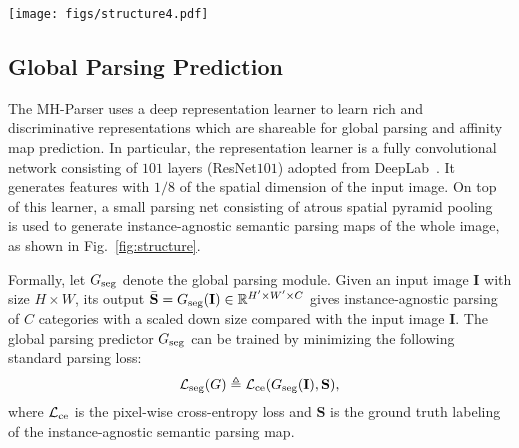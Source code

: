 \documentclass[10pt, letterpaper]{article}
\begin{document}
\begin{figure*}[t]
  \centering
  \texttt{[image: figs/structure4.pdf]}
  \caption{Architecture overview of the proposed Multiple Human Parser (MH-Parser). Here $\mathbf{M}$ refers to the global accordance map, $\mathbf{A}$ refers to the ground truth pairwise affinity map and $\bar{\mathbf{A}}$ denotes the predictions. $\mathbf{A}$ is obtained by rule-based mapping from $\mathbf{M}$ and the corresponding superpixel map (see Eqn.~\eqref{eqn:gt_pam}~and~\eqref{eqn:majority_vote}), and $\bar{\mathbf{A}}$ is the output of the graph generator (consisting of the representation learner and the affinity prediction net). The graph convolution discriminator takes the affinity graph from the graph generator as input and predicts whether it is a ground truth or a prediction. Fusing the predicted instance-agnostic parsing map and instance masks (constructed from $\bar{\mathbf{A}}$) gives the instance-aware parsing results.} \label{fig:structure}
\end{figure*}

\subsection{Global Parsing Prediction}
The MH-Parser uses a deep representation learner to learn rich and discriminative representations which are shareable for global parsing  and  affinity map prediction. In particular,  the representation learner is a fully convolutional network consisting of $101$ layers (ResNet$101$) adopted from DeepLab~\cite{chen2016deeplab}. It generates features with $1/8$ of the spatial dimension of the input image. On top of this learner, a small parsing net consisting of atrous spatial pyramid pooling~\cite{chen2016deeplab} is used to generate instance-agnostic semantic parsing maps of the whole image, as shown in Fig.~\ref{fig:structure}.

Formally, let $G_{\rm{seg}}$ denote the global parsing module. Given an input image $\mathbf{I}$ with size $H \times W$,  its output $\bar{\mathbf{S}} = G_{\rm{seg}}(\mathbf{I}) \in \mathbb{R}^{H' \times W'\times C} $ gives instance-agnostic parsing of $C$ categories with a scaled down size compared with the input image $\mathbf{I}$. The global parsing predictor $G_{\rm{seg}}$  can be trained by minimizing the following standard parsing loss:
\begin{equation}\label{eqn:seg_loss}
\small
\mathcal{L}_{\rm{seg}} (G) \triangleq\mathcal{L}_{\rm{ce}}(G_{\rm{seg}}(\mathbf{I}),\mathbf{S} ),
\end{equation}
where $\mathcal{L}_{\rm{ce}}$ is the pixel-wise cross-entropy loss and $\mathbf{S}$ is the ground truth labeling of the instance-agnostic semantic parsing map. 
\end{document}
